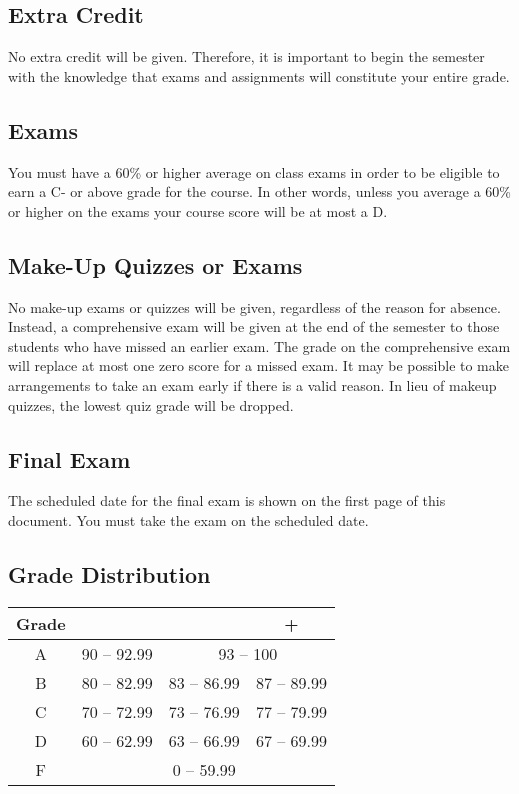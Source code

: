 \documentclass[a4paper,11pt,twocolumn]{article}
\begin{document}
\subsection*{Extra Credit}
\noindent No extra credit will be given. Therefore, it is important to begin the semester with the knowledge that exams and assignments will constitute your entire grade.

\subsection*{Exams}
\noindent You must have a 60\% or higher average on class exams in order to be eligible to earn a C- or above grade for the course. In other words, unless you average a 60\% or higher on the exams your course score will be at most a D.

\subsection*{Make-Up Quizzes or Exams}
\noindent No make-up exams or quizzes will be given, regardless of the reason for absence. Instead, a comprehensive exam will be given at the end of the semester to those students who have missed an earlier exam. The grade on the comprehensive exam will replace at most one zero score for a missed exam. It may be possible to make arrangements to take an exam early if there is a valid reason. In lieu of makeup quizzes, the lowest quiz grade will be dropped.

\subsection*{Final Exam}
\noindent The scheduled date for the final exam is shown on the first page of this document. You must take the exam on the scheduled date.

\subsection*{Grade Distribution}
{\small\begin{tabular}{|c|c|c|c|}
\hline 
Grade & \textendash{} &  & +\tabularnewline
\hline 
\hline 
A & 90 -- 92.99 & \multicolumn{2}{c|}{93 -- 100}\tabularnewline
\hline 
B & 80 -- 82.99 & 83 -- 86.99 & 87 -- 89.99\tabularnewline
\hline 
C & 70 -- 72.99 & 73 -- 76.99 & 77 -- 79.99\tabularnewline
\hline 
D & 60 -- 62.99 & 63 -- 66.99 & 67 -- 69.99\tabularnewline
\hline 
F & \multicolumn{3}{c|}{0 -- 59.99}\tabularnewline
\hline 
\end{tabular}}
\end{document}
